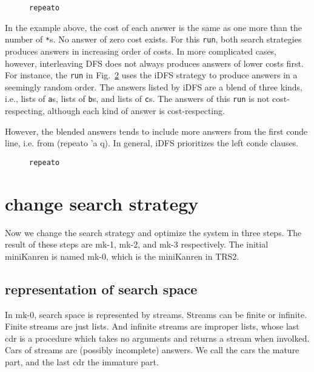 \documentclass[format=acmlarge, review=true, authordraft=true]{acmart}
\begin{document}
\begin{figure}
  
  \caption{\texttt{repeato}}
  \label{repeato-1}
\end{figure}

In the  example above, the cost of each answer is the same as one more than the number of \texttt{*}s. No answer of zero cost exists. For this \texttt{run}, both search strategies produces answers in increasing order of costs. In more complicated cases, however, interleaving DFS does not always produces answers of lower costs first. For instance, the \texttt{run} in Fig.~\ref{repeato-2} uses the iDFS strategy to produce answers in a seemingly random order. The answers listed by iDFS are a blend of three kinds, i.e., lists of \texttt{a}s, lists of \texttt{b}s, and lists of \texttt{c}s. The answers of this \texttt{run} is not cost-respecting, although each kind of answer is cost-respecting.  
 

However, the blended answers tends to include more answers from the first conde line, i.e. from (repeato 'a q). In general, iDFS prioritizes the left conde clauses.

\begin{figure}
	
	\caption{\texttt{repeato}}
	\label{repeato-2}
\end{figure}



\section{change search strategy}

Now we change the search strategy and optimize the system in three steps. The result of these steps are mk-1, mk-2, and mk-3 respectively. The initial miniKanren is named mk-0, which is the miniKanren in TRS2.

\subsection{representation of search space}

In mk-0, search space is represented by streams. Streams can be finite or infinite. Finite streams are just lists. And infinite streams are improper lists, whose last cdr is a procedure which takes no arguments and returns a stream when involked. Cars of streams are (possibly incomplete) answers. We call the cars the mature part, and the last cdr the immature part.
\end{document}
